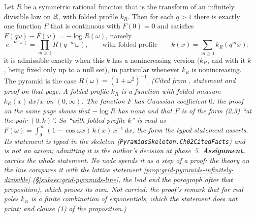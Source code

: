 \begin{theorem}
\label{thm:cited-A20}
\notready
Let $R$ be a symmetric rational function that is the transform of an infinitely divisible law on
$\mathbb{R}$, with folded \Levy{} profile $k_R$. Then for each $q > 1$ there is exactly one function $F$
that is continuous with $F(0) = 0$ and satisfies $F(q\omega) - F(\omega) = -\log R(\omega)$,
namely
\[
  e^{-F(\omega)} = \prod_{m \ge 1}R(q^{-m}\omega), \qquad\text{with folded profile}\qquad
  k(x) = \sum_{m \ge 1}k_R(q^m x);
\]
it is admissible exactly when this $k$ has a nonincreasing version ($k_R$, and with it $k$, being
fixed only up to a null set), in particular whenever $k_R$ is nonincreasing. The
\Matern{} pyramid is the case $R(\omega) = (1 + \omega^2)^{-1}$.
\statusA\quad{}\quad\emph{(Cited from , statement
and proof on that page. A folded profile $k_R$ is a function with folded \Levy{} measure
$k_R(x)\,dx/x$ on $(0,\infty)$. The function $F$ has Gaussian coefficient $0$: the proof on the same
page shows that $-\log R$ has none and that $F$ is of the form (2.3) ``at the pair $(0,k)$''. So
``with folded profile $k$'' is read as
$F(\omega) = \int_0^\infty(1 - \cos\omega x)\,k(x)\,x^{-1}\,dx$, the form the typed statement
asserts. Its statement is typed in the
skeleton (\texttt{PyramidsSkeleton.Ch02CitedFacts}) and is not an axiom; admitting it is the
author's decision at phase~5.
\textbf{Assignment.}  carries the whole statement. No node spends it as a step of a
proof: the theory on the line compares it with the lattice statement
\ref{prop:grid-pyramids-infinitely-divisible} (\S\ref{subsec:grid-pyramids-line}, the lead and the paragraph
after that proposition), which proves its own. Not carried: the proof's remark that for real poles $k_R$
is a finite combination of exponentials, which the statement does not print; and clause (1) of the
proposition.)}
\end{theorem}

